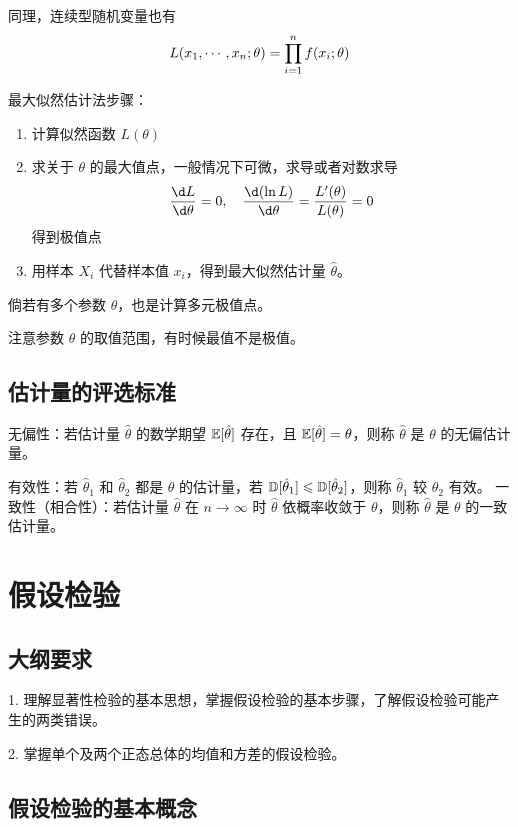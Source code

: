 同理，连续型随机变量也有
\[ L(x_1,\cdots,x_n; \theta) = \prod_{i=1}^n f(x_i; \theta) \]

最大似然估计法步骤：
\begin{enumerate}
	\item 计算似然函数 $L(\theta)$
	\item 求关于 $\theta$ 的最大值点，一般情况下可微，求导或者对数求导
	      \[ \frac{\d L}{\d \theta} = 0, \quad \frac{\d (\ln L)}{\d \theta} = \frac{L'(\theta)}{L(\theta)} = 0 \]
	      得到极值点
	\item 用样本 $X_i$ 代替样本值 $x_i$，得到最大似然估计量 $\hat{\theta}$。
\end{enumerate}
倘若有多个参数 $\theta$，也是计算多元极值点。

\begin{note}
	注意参数 $\theta$ 的取值范围，有时候最值不是极值。
\end{note}

\subsection{估计量的评选标准}

无偏性：若估计量 $\hat{\theta}$ 的数学期望 $\mathbb{E}[\hat{\theta}]$ 存在，且 $\mathbb{E}[\hat{\theta}] = \theta$，则称 $\hat{\theta}$ 是 $\theta$ 的无偏估计量。

有效性：若 $\hat{\theta}_1$ 和 $\hat{\theta}_2$ 都是 $\theta$ 的估计量，若 $\mathbb{D}[\hat{\theta}_1] \leqslant \mathbb{D}[\hat{\theta}_2]$，则称 $\hat{\theta}_1$ 较 $\hat{\theta}_2$ 有效。
一致性（相合性）：若估计量 $\hat{\theta}$ 在 $n \to \infty$ 时 $\hat{\theta}$ 依概率收敛于 $\theta$，则称 $\hat{\theta}$ 是 $\theta$ 的一致估计量。

\section{假设检验}

\subsection{大纲要求}

1. 理解显著性检验的基本思想，掌握假设检验的基本步骤，了解假设检验可能产生的两类错误。

2. 掌握单个及两个正态总体的均值和方差的假设检验。

\subsection{假设检验的基本概念}

